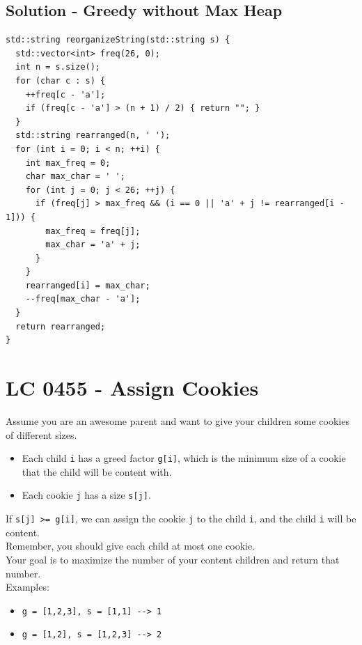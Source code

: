 \subsection*{Solution - Greedy without Max Heap}
\begin{lstlisting}
std::string reorganizeString(std::string s) {
  std::vector<int> freq(26, 0);
  int n = s.size();
  for (char c : s) {
    ++freq[c - 'a'];
    if (freq[c - 'a'] > (n + 1) / 2) { return ""; }
  }
  std::string rearranged(n, ' ');
  for (int i = 0; i < n; ++i) {
    int max_freq = 0;
    char max_char = ' ';
    for (int j = 0; j < 26; ++j) {
      if (freq[j] > max_freq && (i == 0 || 'a' + j != rearranged[i - 1])) {
        max_freq = freq[j];
        max_char = 'a' + j;
      }
    }
    rearranged[i] = max_char;
    --freq[max_char - 'a'];
  }
  return rearranged;
}
\end{lstlisting}

\section{LC 0455 - Assign Cookies}
Assume you are an awesome parent and want to give your children some cookies of different sizes.
\begin{itemize}
	\item Each child {\colorbox{CodeBackground}{\lstinline|i|}} has a greed factor {\colorbox{CodeBackground}{\lstinline|g[i]|}}, which is the minimum size of a cookie that the child will be content with.
	\item Each cookie {\colorbox{CodeBackground}{\lstinline|j|}} has a size {\colorbox{CodeBackground}{\lstinline|s[j]|}}.
\end{itemize}
If {\colorbox{CodeBackground}{\lstinline|s[j] >= g[i]|}}, we can assign the cookie {\colorbox{CodeBackground}{\lstinline|j|}} to the child {\colorbox{CodeBackground}{\lstinline|i|}}, and the child {\colorbox{CodeBackground}{\lstinline|i|}} will be content. \\

Remember, you should give each child at most one cookie.\\

Your goal is to maximize the number of your content children and return that number.\\

Examples:
\begin{itemize}
	\item {\colorbox{CodeBackground}{\lstinline|g = [1,2,3], s = [1,1] --> 1|}}
	\item {\colorbox{CodeBackground}{\lstinline|g = [1,2], s = [1,2,3] --> 2|}}
\end{itemize}

